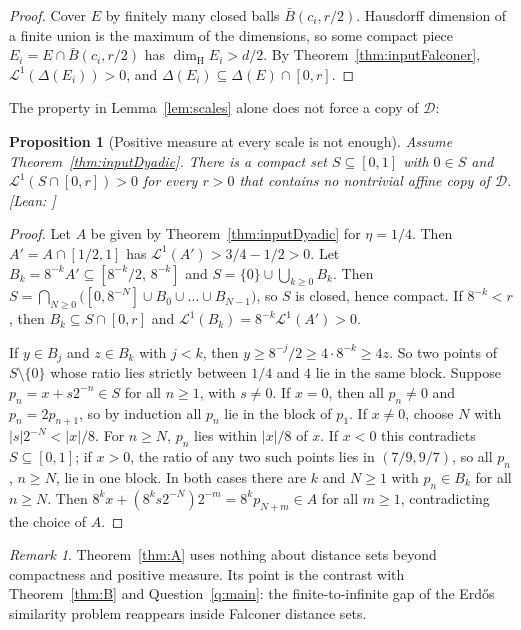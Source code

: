 \documentclass[11pt]{amsart}
\newtheorem{proposition}[theorem]{Proposition}
\theoremstyle{definition}
\theoremstyle{remark}
\newtheorem{remark}[theorem]{Remark}
\newcommand{\dimH}{\dim_{\mathrm H}}
\newcommand{\Lm}{\mathcal{L}}
\newcommand{\Dy}{\mathcal{D}}
\newcommand{\lean}[1]{\texttt{\detokenize{#1}}}
\newcommand{\leanref}[1]{\hfill{\footnotesize[Lean: \lean{#1}]}}
\begin{document}
\begin{proof}
Cover $E$ by finitely many closed balls $\bar B(c_i,r/2)$. Hausdorff dimension of a finite union
is the maximum of the dimensions, so some compact piece $E_i=E\cap\bar B(c_i,r/2)$ has
$\dimH E_i>d/2$. By Theorem~\ref{thm:inputFalconer}, $\Lm^1(\Delta(E_i))>0$, and
$\Delta(E_i)\subseteq\Delta(E)\cap[0,r]$.
\end{proof}

The property in Lemma~\ref{lem:scales} alone does not force a copy of $\Dy$:

\begin{proposition}[Positive measure at every scale is not enough]\label{prop:scalesfree}
Assume Theorem~\ref{thm:inputDyadic}. There is a compact set $S\subseteq[0,1]$ with $0\in S$ and
$\Lm^1(S\cap[0,r])>0$ for every $r>0$ that contains no nontrivial affine copy of $\Dy$.
\leanref{exists_dyadicFree_pos_every_scale}
\end{proposition}

\begin{proof}
Let $A$ be given by Theorem~\ref{thm:inputDyadic} for $\eta=1/4$. Then $A'=A\cap[1/2,1]$ has
$\Lm^1(A')>3/4-1/2>0$. Let $B_k=8^{-k}A'\subseteq[8^{-k}/2,\,8^{-k}]$ and
$S=\{0\}\cup\bigcup_{k\ge0}B_k$. Then
$S=\bigcap_{N\ge0}\bigl([0,8^{-N}]\cup B_0\cup\dots\cup B_{N-1}\bigr)$, so $S$ is closed, hence
compact. If $8^{-k}<r$, then $B_k\subseteq S\cap[0,r]$ and $\Lm^1(B_k)=8^{-k}\Lm^1(A')>0$.

If $y\in B_j$ and $z\in B_k$ with $j<k$, then $y\ge 8^{-j}/2\ge4\cdot8^{-k}\ge4z$. So two points of
$S\setminus\{0\}$ whose ratio lies strictly between $1/4$ and $4$ lie in the same block. Suppose
$p_n=x+s2^{-n}\in S$ for all $n\ge1$, with $s\ne0$. If $x=0$, then all $p_n\ne0$ and
$p_n=2p_{n+1}$, so by induction all $p_n$ lie in the block of $p_1$. If $x\ne0$, choose $N$ with
$|s|2^{-N}<|x|/8$. For $n\ge N$, $p_n$ lies within $|x|/8$ of $x$. If $x<0$ this contradicts
$S\subseteq[0,1]$; if $x>0$, the ratio of any two such points lies in $(7/9,9/7)$, so all $p_n$,
$n\ge N$, lie in one block. In both cases there are $k$ and $N\ge1$ with $p_n\in B_k$ for all
$n\ge N$. Then $8^kx+(8^ks2^{-N})2^{-m}=8^kp_{N+m}\in A$ for all $m\ge1$, contradicting the choice
of $A$.
\end{proof}

\begin{remark}
Theorem~\ref{thm:A} uses nothing about distance sets beyond compactness and positive measure. Its
point is the contrast with Theorem~\ref{thm:B} and Question~\ref{q:main}: the finite-to-infinite
gap of the Erd\H{o}s similarity problem reappears inside Falconer distance sets.
\end{remark}
\end{document}

